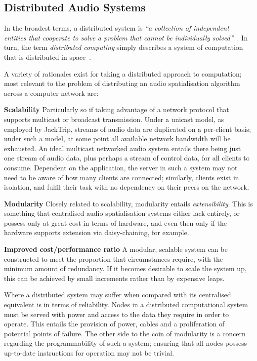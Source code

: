 \subsection{Distributed Audio Systems}\label{subsec:distributed-audio-systems}

In the broadest terms, a distributed system is \textit{``a collection of
independent entities that cooperate to solve a problem that cannot be
individually solved''}~\citep{kshemkalyani_distributed_2011}.
In turn, the term \textit{distributed computing} simply describes a system of
computation that is distributed in
space~\citep{lamport_distributed_1990}.

A variety of rationales exist for taking a distributed approach to
computation;
most relevant to the problem of distributing an audio spatialisation algorithm
across a computer network are:

\textbf{Scalability}
Particularly so if taking advantage of a network protocol that supports
multicast or broadcast transmission.
Under a unicast model, as employed by JackTrip, streams of audio data are
duplicated on a per-client basis;
under such a model, at some point all available network bandwidth will be
exhausted.
An ideal multicast networked audio system entails there being just one stream
of audio data, plus perhaps a stream of control data, for all clients to
consume.
Dependent on the application, the server in such a system may not need to be
aware of how many clients are connected; similarly, clients exist in isolation,
and fulfil their task with no dependency on their peers on the network.

\textbf{Modularity}
Closely related to scalability, modularity entails \textit{extensibility}.
This is something that centralised audio spatialisation systems either lack
entirely, or possess only at great cost in terms of hardware, and even then only
if the hardware supports extension via daisy-chaining, for example.

\textbf{Improved cost/performance ratio}
A modular, scalable system can be constructed to meet the proportion that
circumstances require, with the minimum amount of redundancy.
If it becomes desirable to scale the system up, this can be achieved by small
increments rather than by expensive leaps.

Where a distributed system may suffer when compared with its centralised
equivalent is in terms of reliability.
Nodes in a distributed computational system must be served with power and access
to the data they require in order to operate.
This entails the provision of power, cables and a proliferation of potential
points of failure.
The other side to the coin of modularity is a concern regarding the
programmability of such a system;
ensuring that all nodes possess up-to-date instructions for operation may not be
trivial.

